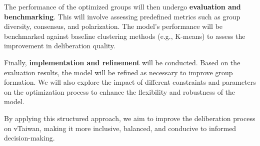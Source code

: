 \documentclass[11pt,a4paper]{article}
\begin{document}
The performance of the optimized groups will then undergo \textbf{evaluation and benchmarking}. This will involve assessing predefined metrics such as group diversity, consensus, and polarization. The model's performance will be benchmarked against baseline clustering methods (e.g., K-means) to assess the improvement in deliberation quality.

Finally, \textbf{implementation and refinement} will be conducted. Based on the evaluation results, the model will be refined as necessary to improve group formation. We will also explore the impact of different constraints and parameters on the optimization process to enhance the flexibility and robustness of the model.

By applying this structured approach, we aim to improve the deliberation process on vTaiwan, making it more inclusive, balanced, and conducive to informed decision-making.










\end{document}
